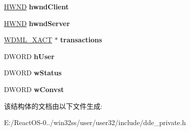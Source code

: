\begin{DoxyCompactItemize}
\hyperlink{interfacevoid}{H\+W\+ND} {\bfseries hwnd\+Client}
\item 
\mbox{\label{structtag_w_d_m_l___c_o_n_v_a262c2f0a331d26ffdbbf1e8ebec085c5}} 
\hyperlink{interfacevoid}{H\+W\+ND} {\bfseries hwnd\+Server}
\item 
\mbox{\label{structtag_w_d_m_l___c_o_n_v_a92ee8c1b36c1257d04d33396ef02b152}} 
\hyperlink{structtag_w_d_m_l___x_a_c_t}{W\+D\+M\+L\+\_\+\+X\+A\+CT} $\ast$ {\bfseries transactions}
\item 
\mbox{\label{structtag_w_d_m_l___c_o_n_v_a58c7b9ddda41c693f3c09f5ac0304d48}} 
D\+W\+O\+RD {\bfseries h\+User}
\item 
\mbox{\label{structtag_w_d_m_l___c_o_n_v_a0f4e5727ebe2a0e8504a06a420a922a6}} 
D\+W\+O\+RD {\bfseries w\+Status}
\item 
\mbox{\label{structtag_w_d_m_l___c_o_n_v_a75d1e0ccddbe6e597c38fa7003d580a0}} 
D\+W\+O\+RD {\bfseries w\+Convst}
\end{DoxyCompactItemize}


该结构体的文档由以下文件生成\+:\begin{DoxyCompactItemize}
\item 
E\+:/\+React\+O\+S-\/0../win32ss/user/user32/include/dde\+\_\+private.\+h\end{DoxyCompactItemize}
